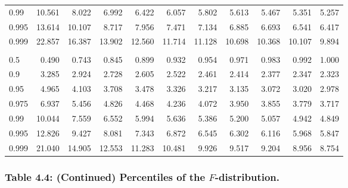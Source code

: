 \documentclass[
]{article}
\begin{document}
\begin{table}[H]
\begin{tabular}{lrrrrrrrrrr}
\hspace{1em}0.99 & 10.561 & 8.022 & 6.992 & 6.422 & 6.057 & 5.802 & 5.613 & 5.467 & 5.351 & 5.257\\
\hspace{1em}0.995 & 13.614 & 10.107 & 8.717 & 7.956 & 7.471 & 7.134 & 6.885 & 6.693 & 6.541 & 6.417\\
\hspace{1em}0.999 & 22.857 & 16.387 & 13.902 & 12.560 & 11.714 & 11.128 & 10.698 & 10.368 & 10.107 & 9.894\\
\addlinespace[0.3em]
\multicolumn{11}{l}{\textbf{$k_2=10$}}\\
\hspace{1em}0.5 & 0.490 & 0.743 & 0.845 & 0.899 & 0.932 & 0.954 & 0.971 & 0.983 & 0.992 & 1.000\\
\hspace{1em}0.9 & 3.285 & 2.924 & 2.728 & 2.605 & 2.522 & 2.461 & 2.414 & 2.377 & 2.347 & 2.323\\
\hspace{1em}0.95 & 4.965 & 4.103 & 3.708 & 3.478 & 3.326 & 3.217 & 3.135 & 3.072 & 3.020 & 2.978\\
\hspace{1em}0.975 & 6.937 & 5.456 & 4.826 & 4.468 & 4.236 & 4.072 & 3.950 & 3.855 & 3.779 & 3.717\\
\hspace{1em}0.99 & 10.044 & 7.559 & 6.552 & 5.994 & 5.636 & 5.386 & 5.200 & 5.057 & 4.942 & 4.849\\
\hspace{1em}0.995 & 12.826 & 9.427 & 8.081 & 7.343 & 6.872 & 6.545 & 6.302 & 6.116 & 5.968 & 5.847\\
\hspace{1em}0.999 & 21.040 & 14.905 & 12.553 & 11.283 & 10.481 & 9.926 & 9.517 & 9.204 & 8.956 & 8.754\\
\bottomrule
\end{tabular}
\end{table}

\newpage

\hypertarget{table-4.4-continued-percentiles-of-the-f-distribution.}{%
\subsubsection{\texorpdfstring{Table 4.4: (Continued) Percentiles of the
\(F\)-distribution.}{Table 4.4: (Continued) Percentiles of the F-distribution.}}\label{table-4.4-continued-percentiles-of-the-f-distribution.}}
\end{document}
